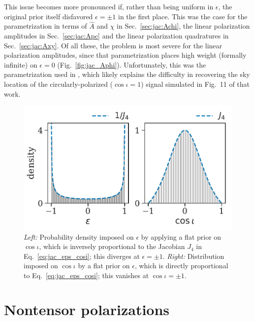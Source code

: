 \documentclass[aps,prd,twocolumn,superscriptaddress,preprintnumbers,floatfix,nofootinbib]{revtex4-2}
\newcommand*{\eq}[1]{Eq.~\eqref{eq:#1}}
\begin{document}
This issue becomes more pronounced if, rather than being uniform in $\epsilon$, the original prior itself disfavored $\epsilon = \pm 1$ in the first place.
This was the case for the parametrization in terms of $\hat{A}$ and $\chi$ in Sec.~\ref{sec:jac:Achi}, the linear polarization amplitudes in Sec.~\ref{sec:jac:Apc} and the linear polarization quadratures in Sec.~\ref{sec:jac:Axy}.
Of all these, the problem is most severe for the linear polarization amplitudes, since that parametrization places high weight (formally infinite) on $\epsilon = 0$ (Fig.~\ref{fig:jac_Aphi}).
Unfortunately, this was the parametrization used in \cite{Chatziioannou:2021mij}, which likely explains the difficulty in recovering the sky location of the circularly-polarized ($\cos\iota=1$) signal simulated in Fig.~11 of that work.

\begin{figure}
\includegraphics[width=\columnwidth]{jac_eps_cosi}
\caption{\emph{Left:} Probability density imposed on $\epsilon$ by applying a flat prior on $\cos\iota$, which is inversely proportional to the Jacobian $J_4$ in \eq{jac_eps_cosi}; this diverges at $\epsilon = \pm 1$.
\emph{Right:} Distribution imposed on $\cos\iota$ by a flat prior on $\epsilon$, which is directly proportional to \eq{jac_eps_cosi}; this vanishes at $\cos\iota = \pm 1$.
}
\label{fig:jac_cosi}
\end{figure}

\section{Nontensor polarizations}
\label{sec:nongr}

\newcommand{\xsym}{\ensuremath{\rm x}}
\newcommand{\ysym}{{\rm y}}
\newcommand{\bsym}{{\rm b}}
\newcommand{\lsym}{{\rm l}}
\newcommand{\hx}{h_{\xsym}}
\newcommand{\hy}{h_{\ysym}}
\newcommand{\hb}{h_{\bsym}}
\newcommand{\hlon}{h_{\lsym}}
\end{document}
